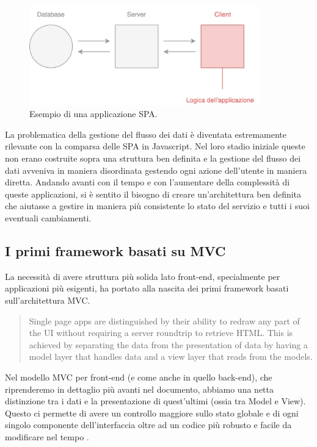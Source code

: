 \begin{figure}[h]
\centering
\includegraphics[width=10cm]{./images/yesSPA} 
\caption{Esempio di una applicazione SPA.}
\end{figure}

\noindent
La problematica della gestione del flusso dei dati è diventata estremamente rilevante con la comparsa delle SPA in Javascript. Nel loro stadio iniziale queste non erano costruite sopra una struttura ben definita e la gestione del flusso dei dati avveniva in maniera disordinata gestendo ogni azione dell'utente in maniera diretta.
Andando avanti con il tempo e con l'aumentare della complessità di queste applicazioni, si è sentito il bisogno di creare un'architettura ben definita che aiutasse a gestire in maniera più consistente lo stato del servizio e tutti i suoi eventuali cambiamenti.

\subsection{I primi framework basati su MVC}
La necessità di avere struttura più solida lato front-end, specialmente per applicazioni più esigenti, ha portato alla nascita dei primi framework basati sull'architettura MVC.

\blockquote{Single page apps are distinguished by their ability to redraw any part of the UI without requiring a server roundtrip to retrieve HTML. This is achieved by separating the data from the presentation of data by having a model layer that handles data and a view layer that reads from the models. \cite{MixuSinglePageWebApp}}

\noindent Nel modello MVC per front-end (e come anche in quello back-end), che riprenderemo in dettaglio più avanti nel documento, abbiamo una netta distinzione tra i dati e la presentazione di quest'ultimi (ossia tra Model e View). Questo ci permette di avere un controllo maggiore sullo stato globale e di ogni singolo componente dell'interfaccia oltre ad un codice più robusto e facile da modificare nel tempo \cite{ParrOnTheMVC}.

